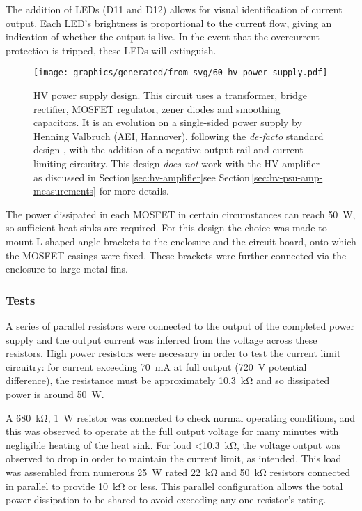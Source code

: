 The addition of \gls{LED}s (D11 and D12) allows for visual identification of current output. Each \gls{LED}'s brightness is proportional to the current flow, giving an indication of whether the output is live. In the event that the overcurrent protection is tripped, these \gls{LED}s will extinguish.

\begin{figure}
  \centering
  \texttt{[image: graphics/generated/from-svg/60-hv-power-supply.pdf]}
  \caption{\gls{HV} power supply design. This circuit uses a transformer, bridge rectifier, \gls{MOSFET} regulator, zener diodes and smoothing capacitors. It is an evolution on a single-sided power supply by Henning Valbruch (AEI, Hannover), following the \emph{de-facto} standard design \cite{Horowitz2015}, with the addition of a negative output rail and current limiting circuitry. This design \emph{does not} work with the \gls{HV} amplifier as discussed in Section\,\ref{sec:hv-amplifier}\textemdash see Section\,\ref{sec:hv-psu-amp-measurements} for more details.}
  \label{fig:hv-power-supply}
\end{figure}

The power dissipated in each \gls{MOSFET} in certain circumstances can reach \SI{50}{\watt}, so sufficient heat sinks are required. For this design the choice was made to mount L-shaped angle brackets to the enclosure and the circuit board, onto which the \gls{MOSFET} casings were fixed. These brackets were further connected via the enclosure to large metal fins. 

\subsubsection{\label{sec:hv-psu-tests}Tests}

A series of parallel resistors were connected to the output of the completed power supply and the output current was inferred from the voltage across these resistors. High power resistors were necessary in order to test the current limit circuitry: for current exceeding \SI{70}{\milli\ampere} at full output (\SI{720}{\volt} potential difference), the resistance must be approximately \SI{10.3}{\kilo\ohm} and so dissipated power is around \SI{50}{\watt}.

A \SI{680}{\kilo\ohm}, \SI{1}{\watt} resistor was connected to check normal operating conditions, and this was observed to operate at the full output voltage for many minutes with negligible heating of the heat sink. For load \SI{<10.3}{\kilo\ohm}, the voltage output was observed to drop in order to maintain the current limit, as intended. This load was assembled from numerous \SI{25}{\watt} rated \SI{22}{\kilo\ohm} and \SI{50}{\kilo\ohm} resistors connected in parallel to provide \SI{10}{\kilo\ohm} or less. This parallel configuration allows the total power dissipation to be shared to avoid exceeding any one resistor's rating.

